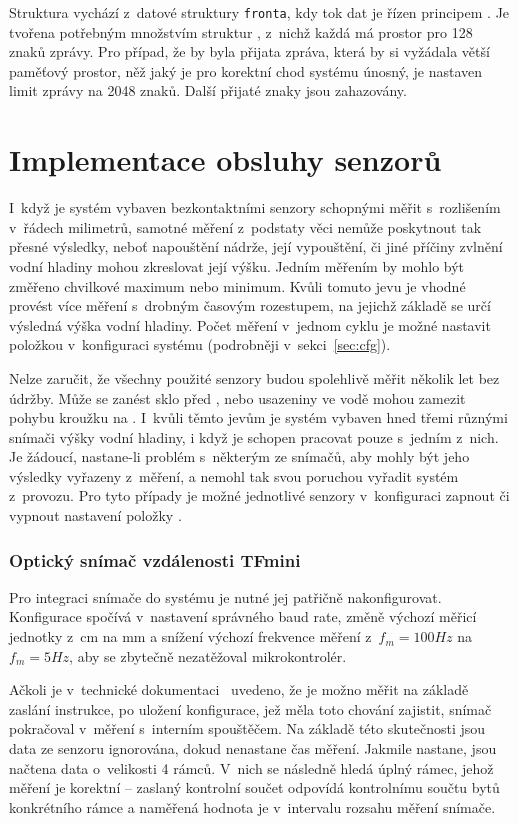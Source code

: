         Struktura  vychází z~datové struktury \texttt{fronta}, kdy tok dat je řízen principem . Je tvořena potřebným množstvím struktur , z~nichž každá má prostor pro 128 znaků zprávy. Pro případ, že by byla přijata zpráva, která by si vyžádala větší paměťový prostor, něž jaký je pro korektní chod systému únosný, je nastaven limit zprávy na 2048 znaků. Další přijaté znaky jsou zahazovány.

    \section{Implementace obsluhy senzorů}
        I~když je systém vybaven bezkontaktními senzory schopnými měřit s~rozlišením v~řádech milimetrů, samotné měření z~podstaty věci nemůže poskytnout tak přesné výsledky, neboť napouštění nádrže, její vypouštění, či jiné příčiny zvlnění vodní hladiny mohou zkreslovat její výšku. Jedním měřením by mohlo být změřeno chvilkové maximum nebo minimum. Kvůli tomuto jevu je vhodné provést více měření s~drobným časovým rozestupem, na jejichž základě se určí výsledná výška vodní hladiny. Počet měření v~jednom cyklu je možné nastavit položkou  v~konfiguraci systému (podrobněji v~sekci~\ref{sec:cfg}).

        Nelze zaručit, že všechny použité senzory budou spolehlivě měřit několik let bez údržby. Může se zanést sklo před , nebo usazeniny ve vodě mohou zamezit pohybu kroužku na . I~kvůli těmto jevům je systém vybaven hned třemi různými snímači výšky vodní hladiny, i když je schopen pracovat pouze s~jedním z~nich. Je žádoucí, nastane-li problém s~některým ze snímačů, aby mohly být jeho výsledky vyřazeny z~měření, a nemohl tak svou poruchou vyřadit systém z~provozu. Pro tyto případy je možné jednotlivé senzory v~konfiguraci zapnout či vypnout nastavení položky . 

        \subsubsection{Optický snímač vzdálenosti TFmini}
            Pro integraci snímače do systému je nutné jej patřičně nakonfigurovat. Konfigurace spočívá v~nastavení správného baud rate, změně výchozí měřicí jednotky z~cm na mm a snížení výchozí frekvence měření z~$f_m=100\unit{Hz}$ na $f_m=5\unit{Hz}$, aby se zbytečně nezatěžoval mikrokontrolér.

            Ačkoli je v~technické dokumentaci~\cite{sensor:lidar} uvedeno, že je možno měřit na základě zaslání instrukce, po uložení konfigurace, jež měla toto chování zajistit, snímač pokračoval v~měření s~interním spouštěčem. Na základě této skutečnosti jsou data ze senzoru ignorována, dokud nenastane čas měření. Jakmile nastane, jsou načtena data o~velikosti 4 rámců. V~nich se následně hledá úplný rámec, jehož měření je korektní -- zaslaný kontrolní součet odpovídá kontrolnímu součtu bytů konkrétního rámce a naměřená hodnota je v~intervalu rozsahu měření snímače.

